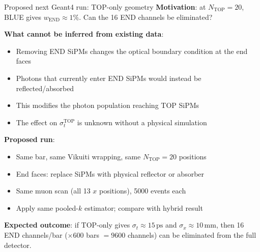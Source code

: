 \documentclass[aspectratio=169,9pt]{beamer}
\newcommand{\NTOP}{N_{\mathrm{TOP}}}
\newcommand{\wend}{w_{\mathrm{END}}}
\newcommand{\ps}{\ensuremath{\,\mathrm{ps}}}
\newcommand{\mm}{\ensuremath{\,\mathrm{mm}}}
\begin{document}
\begin{frame}{Proposed next Geant4 run: TOP-only geometry}
\textbf{Motivation}: at $\NTOP=20$, BLUE gives $\wend \approx 1\%$.
Can the 16 END channels be eliminated?

\vspace{6pt}
\textbf{What cannot be inferred from existing data}:
\begin{itemize}
  \item Removing END SiPMs changes the optical boundary condition at the end faces
  \item Photons that currently enter END SiPMs would instead be reflected/absorbed
  \item This modifies the photon population reaching TOP SiPMs
  \item The effect on $\sigma_t^{\mathrm{TOP}}$ is unknown without a physical simulation
\end{itemize}

\vspace{6pt}
\textbf{Proposed run}:
\begin{itemize}
  \item Same bar, same Vikuiti wrapping, same $\NTOP=20$ positions
  \item End faces: replace SiPMs with physical reflector or absorber
  \item Same muon scan (all 13 $x$ positions), 5000 events each
  \item Apply same pooled-$k$ estimator; compare with hybrid result
\end{itemize}

\vspace{6pt}
\textbf{Expected outcome}: if TOP-only gives $\sigma_t \approx 15\ps$ and $\sigma_x \approx 10\mm$,
then 16 END channels/bar ($\times600$ bars $= 9600$ channels) can be eliminated from the full detector.
\end{frame}
\end{document}
